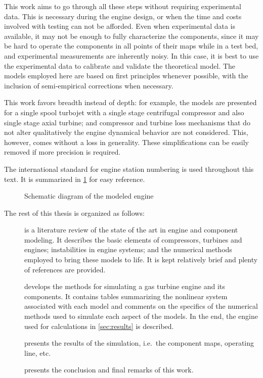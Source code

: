 \documentclass[tcc]{subfiles}
\begin{document}
This work aims to go through all these steps without requiring experimental data.
This is necessary during the engine design, or when the time and costs involved with testing can not be afforded.
Even when experimental data is available, it may not be enough to fully characterize the components,
since it may be hard to operate the components in all points of their maps while in a test bed,
and experimental measurements are inherently noisy. 
In this case, it is best to use the experimental data to calibrate and validate the theoretical model.
The models employed here are based on first principles whenever possible, 
with the inclusion of semi-empirical corrections when necessary. 

This work favors breadth instead of depth: 
for example, the models are presented for a single spool turbojet with a single stage centrifugal compressor and also single stage axial turbine; and compressor and turbine loss mechanisms that do not alter qualitatively the engine dynamical behavior are not considered. 
This, however, comes without a loss in generality. 
These simplifications can be easily removed if more precision is required.

The international standard for engine station numbering \cite{ARP755A} is used throughout this text. 
It is summarized in \cref{fig:engine_schematic} for easy reference.

\begin{figure}[b]
    \caption{Schematic diagram of the modeled engine}
    \label{fig:engine_schematic}
    
    \source{\authorsfigure}
\end{figure}


The rest of this thesis is organized as follows: 
\begin{description}
    \item[] is a literature review of the state of the art in engine and component modeling. 
        It describes the basic elements of compressors, turbines and engines; 
        instabilities in engine systems; and the numerical methods employed to bring these models to life. 
        It is kept relatively brief and plenty of references are provided.
    \item[] develops the methods for simulating a gas turbine engine and its components. 
        It contains tables summarizing the nonlinear system associated with each model 
        and comments on the specifics of the numerical methods used to simulate each aspect of the models. 
        In the end, the engine used for calculations in \cref{sec:results} is described.
    \item[] presents the results of the simulation, i.e.\ the component maps, operating line, etc.
    \item[] presents the conclusion and final remarks of this work.
\end{description}
\end{document}
